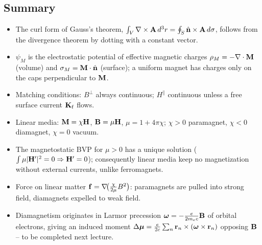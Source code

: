 \subsection{Summary}\label{subsec:lec18-summary}

\begin{itemize}
  \item The curl form of Gauss's theorem,
        $\int_V\nabla\times\mathbf{A}\,d^3r=\oint_S\hat{\mathbf{n}}\times\mathbf{A}\,d\sigma$, follows
        from the divergence theorem by dotting with a constant vector.
  \item $\psi_M$ is the electrostatic potential of effective magnetic charges
        $\rho_M=-\nabla \cdot\mathbf{M}$ (volume) and $\sigma_M=\mathbf{M}\cdot\hat{\mathbf{n}}$ (surface);
        a uniform magnet has charges only on the caps perpendicular to $\mathbf{M}$.
  \item Matching conditions: $B^{\perp}$ always continuous; $H^{\parallel}$ continuous
        unless a free surface current $\mathbf{K}_{\rm f}$ flows.
  \item Linear media: $\mathbf{M}=\chi\mathbf{H}$, $\mathbf{B}=\mu\mathbf{H}$, $\mu=1+4\pi\chi$;
        $\chi>0$ paramagnet, $\chi<0$ diamagnet, $\chi=0$ vacuum.
  \item The magnetostatic BVP for $\mu>0$ has a unique solution
        ($\int\mu|\mathbf{H}'|^2=0\Rightarrow\mathbf{H}'=0$); consequently linear media keep no
        magnetization without external currents, unlike ferromagnets.
  \item Force on linear matter $\mathbf{f}=\nabla \!\bigl(\tfrac{\chi}{2\mu}B^2\bigr)$:
        paramagnets are pulled into strong field, diamagnets expelled to weak field.
  \item Diamagnetism originates in Larmor precession
        $\boldsymbol{\omega}=-\tfrac{e}{2m_ec}\mathbf{B}$ of orbital electrons, giving an induced
        moment $\Delta\boldsymbol{\mu}=\tfrac{e}{2c}\sum_n\mathbf{r}_n\times(\boldsymbol{\omega}\times\mathbf{r}_n)$
        opposing $\mathbf{B}$ -- to be completed next lecture.
\end{itemize}
